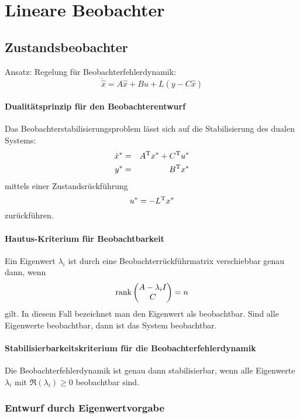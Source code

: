 \chapter{Lineare Beobachter}
\section{Zustandsbeobachter}
Ansatz: Regelung für Beobachterfehlerdynamik:
\begin{equation}
    \dot{\hat{x}} = A \hat{x} + Bu + L (y - C \hat{x})
\end{equation}

\subsubsection{Dualitätsprinzip für den Beobachterentwurf}
Das Beobachterstabilisierungsproblem lässt sich auf die Stabilisierung des dualen
Systems:
\begin{eqnarray}
    \dot{x}^* &=& {A}^\text{T} x^* + {C}^\text{T} u^* \\
    y^* &=& {B}^\text{T} x^*
\end{eqnarray}
mittels einer Zustandsrückführung
\begin{equation}
    u^* = -{L}^\text{T} x^*
\end{equation}
zurückführen.

\subsubsection{Hautus-Kriterium für Beobachtbarkeit}
Ein Eigenwert $\lambda_i$ ist durch eine Beobachterrückführmatrix verschiebbar genau
dann, wenn
\begin{equation}
    \operatorname*{rank} \begin{pmatrix} A - \lambda_i I \\ C \end{pmatrix} = n
\end{equation}
gilt. In diesem Fall bezeichnet man den Eigenwert als beobachtbar. Sind alle Eigenwerte
beobachtbar, dann ist das System beobachtbar.

\subsubsection{Stabilisierbarkeitskriterium für die Beobachterfehlerdynamik}
Die Beobachterfehlerdynamik ist genau dann stabilisierbar, wenn alle Eigenwerte
$\lambda_i$ mit $\Re(\lambda_i) \geq 0$ beobachtbar sind.
    
\subsection{Entwurf durch Eigenwertvorgabe}
